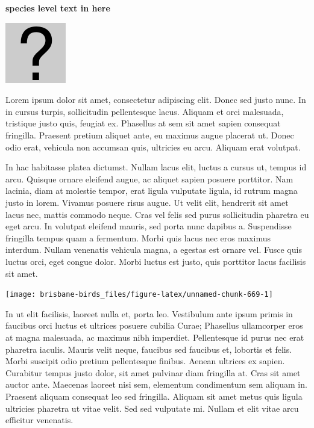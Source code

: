 \documentclass[]{book}
\let\origfigure\figure
\let\endorigfigure\endfigure
\renewenvironment{figure}[1][2] {
  \expandafter\origfigure\expandafter[H]
} {
  \endorigfigure
}
\begin{document}
\textbf{species level text in here}

\begin{figure}
\centering
\includegraphics{assets/missing.png}
\caption{No image for species}
\end{figure}

Lorem ipsum dolor sit amet, consectetur adipiscing elit. Donec sed justo
nunc. In in cursus turpis, sollicitudin pellentesque lacus. Aliquam et
orci malesuada, tristique justo quis, feugiat ex. Phasellus at sem sit
amet sapien consequat fringilla. Praesent pretium aliquet ante, eu
maximus augue placerat ut. Donec odio erat, vehicula non accumsan quis,
ultricies eu arcu. Aliquam erat volutpat.

In hac habitasse platea dictumst. Nullam lacus elit, luctus a cursus ut,
tempus id arcu. Quisque ornare eleifend augue, ac aliquet sapien posuere
porttitor. Nam lacinia, diam at molestie tempor, erat ligula vulputate
ligula, id rutrum magna justo in lorem. Vivamus posuere risus augue. Ut
velit elit, hendrerit sit amet lacus nec, mattis commodo neque. Cras vel
felis sed purus sollicitudin pharetra eu eget arcu. In volutpat eleifend
mauris, sed porta nunc dapibus a. Suspendisse fringilla tempus quam a
fermentum. Morbi quis lacus nec eros maximus interdum. Nullam venenatis
vehicula magna, a egestas est ornare vel. Fusce quis luctus orci, eget
congue dolor. Morbi luctus est justo, quis porttitor lacus facilisis sit
amet.

\begin{figure}
\texttt{[image: brisbane-birds\_files/figure-latex/unnamed-chunk-669-1]} \caption{insert figure caption}\label{fig:unnamed-chunk-669}
\end{figure}

In ut elit facilisis, laoreet nulla et, porta leo. Vestibulum ante ipsum
primis in faucibus orci luctus et ultrices posuere cubilia Curae;
Phasellus ullamcorper eros at magna malesuada, ac maximus nibh
imperdiet. Pellentesque id purus nec erat pharetra iaculis. Mauris velit
neque, faucibus sed faucibus et, lobortis et felis. Morbi suscipit odio
pretium pellentesque finibus. Aenean ultrices ex sapien. Curabitur
tempus justo dolor, sit amet pulvinar diam fringilla at. Cras sit amet
auctor ante. Maecenas laoreet nisi sem, elementum condimentum sem
aliquam in. Praesent aliquam consequat leo sed fringilla. Aliquam sit
amet metus quis ligula ultricies pharetra ut vitae velit. Sed sed
vulputate mi. Nullam et elit vitae arcu efficitur venenatis.
\end{document}
